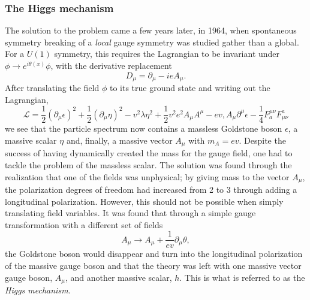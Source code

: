 \subsubsection{The Higgs mechanism}
The solution to the problem came a few years later, in 1964, when spontaneous symmetry breaking of a \emph{local} gauge symmetry was studied gather than a global. For a $U(1)$ symmetry, this requires the Lagrangian to be invariant under $\phi \rightarrow e^{i\theta(x)}\phi$, with the derivative replacement
\begin{equation}
D_{\mu}=\partial_{\mu}-ie A_{\mu}.
\end{equation}
After translating the field $\phi$ to its true ground state and writing out the Lagrangian,
\begin{equation}
  \label{eq:theory:higgsL}
\mathcal{L} = \frac{1}{2}(\partial_{\mu}\epsilon)^2 + \frac{1}{2}(\partial_{\mu}\eta)^2-v^2\lambda \eta^2+\frac{1}{2}v^2 e^2 A_{\mu} A^{\mu}-ev, A_{\mu}\partial^{\mu}\epsilon-\frac{1}{4}F_{a}^{\mu\nu}F^{a}_{\mu\nu}
\end{equation}
we see that the particle spectrum now contains a massless Goldstone boson $\epsilon$, a massive scalar $\eta$ and, finally, a massive vector $A_{\mu}$ with $m_A=ev$. Despite the success of having dynamically created the mass for the gauge field, one had to tackle the problem of the massless scalar. The solution was found through the realization that one of the fields was unphysical; by giving mass to the vector $A_{\mu}$, the polarization degrees of freedom had increased from 2 to 3 through adding a longitudinal polarization. However, this should not be possible when simply translating field variables. It was found that through a simple gauge transformation with a different set of fields
\begin{equation}
A_{\mu} \rightarrow A_{\mu}+\frac{1}{ev}\partial_{\mu}\theta,
\end{equation}
the Goldstone boson would disappear and turn into the longitudinal polarization of the massive gauge boson and that the theory was left with one massive vector gauge boson, $A_{\mu}$, and another massive scalar, $h$. This is what is referred to as the \emph{Higgs mechanism}.

